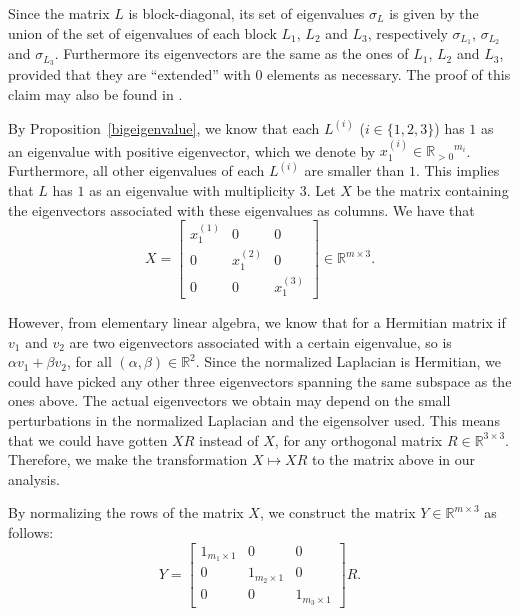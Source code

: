 Since the matrix $L$ is block-diagonal, its set of eigenvalues $\sigma _L$ is given by the union of the set of eigenvalues of each block $L_1$, $L_2$ and $L_3$, respectively $\sigma_{L_1}$, $\sigma_{L_2}$ and $\sigma_{L_3}$.
Furthermore its eigenvectors are the same as the ones of $L_1$, $L_2$ and $L_3$, provided that they are ``extended'' with $0$ elements as necessary. 
The proof of this claim may also be found in \cite{mahoney}.

By Proposition~\vref{bigeigenvalue}, we know that each $L^{(i)}$ ($i \in \{1, 2, 3 \}$) has $1$ as an eigenvalue with positive eigenvector, which we denote by $x_1^{(i)} \in {\mathbb R_{>0}}^{m_i} $. Furthermore, all other eigenvalues of each $L^{(i)}$ are smaller than $1$.
This implies that $L$ has $1$ as an eigenvalue with multiplicity $3$.
Let $X$ be the matrix containing the eigenvectors associated with these eigenvalues as columns. We have that 
\begin{equation}
   X =
   \begin{bmatrix}
      x_1^{(1)} & 0 & 0 \\
      0 & x_1^{(2)} & 0 \\
      0 & 0 & x_1^{(3)}
   \end{bmatrix}
   \in \mathbb R^{m \times 3}.
\end{equation}

However, from elementary linear algebra, we know that for a Hermitian matrix if $v_1$ and $v_2$ are two eigenvectors associated with a certain eigenvalue, so is $\alpha v_1 + \beta v_2$, for all $(\alpha, \beta) \in \mathbb R ^2$.
Since the normalized Laplacian is Hermitian, we could have picked any other three eigenvectors spanning the same subspace as the ones above.
The actual eigenvectors we obtain may depend on the small perturbations in the normalized Laplacian and the eigensolver used.
This means that we could have gotten $XR$ instead of $X$, for any orthogonal matrix $R \in \mathbb{R}^{3 \times 3}$.
Therefore, we make the transformation $X \longmapsto XR$ to the matrix above in our analysis.

By normalizing the rows of the matrix $X$, we construct the matrix $Y \in \mathbb{R}^{m \times 3}$ as follows:
\begin{equation}\label{y}
   Y = 
   \begin{bmatrix}
      1_{m_1 \times 1} & 0 & 0 \\
      0 & 1_{m_2 \times 1} & 0 \\
      0 & 0 & 1_{m_3 \times 1} 
   \end{bmatrix}R.
\end{equation}

